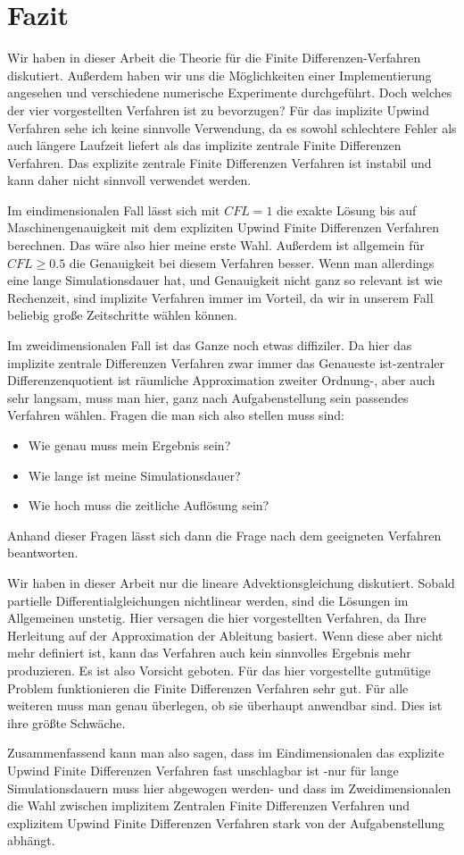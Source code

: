 \documentclass[12pt,a4paper]{scrartcl}
\numberwithin{equation}{section} %
\theoremstyle{definition}
\theoremstyle{plain}
\begin{document}
\section{Fazit}
Wir haben in dieser Arbeit die Theorie für die Finite Differenzen-Verfahren diskutiert. Außerdem haben wir uns die Möglichkeiten einer Implementierung angesehen und verschiedene numerische Experimente durchgeführt. Doch welches der vier vorgestellten Verfahren ist zu bevorzugen? Für das implizite Upwind Verfahren sehe ich keine sinnvolle Verwendung, da es sowohl schlechtere Fehler als auch längere Laufzeit liefert als das implizite zentrale Finite Differenzen Verfahren. Das explizite zentrale Finite Differenzen Verfahren ist instabil und kann daher nicht sinnvoll verwendet werden. 
\par Im eindimensionalen Fall lässt sich mit $CFL=1$ die exakte Lösung bis auf Maschinengenauigkeit mit dem expliziten Upwind Finite Differenzen Verfahren berechnen. Das wäre also hier meine erste Wahl. Außerdem ist allgemein für $CFL\ge 0.5$ die Genauigkeit bei diesem Verfahren besser. Wenn man allerdings eine lange Simulationsdauer hat, und Genauigkeit nicht ganz so relevant ist wie Rechenzeit, sind implizite Verfahren immer im Vorteil, da wir in unserem Fall beliebig große Zeitschritte wählen können.
\par Im zweidimensionalen Fall ist das Ganze noch etwas diffiziler. Da hier das implizite zentrale Differenzen Verfahren zwar immer das Genaueste ist-zentraler Differenzenquotient ist räumliche Approximation zweiter Ordnung-, aber auch sehr langsam, muss man hier, ganz nach Aufgabenstellung sein passendes Verfahren wählen. Fragen die man sich also stellen muss sind: 
\begin{itemize}
\item Wie genau muss mein Ergebnis sein?
\item Wie lange ist meine Simulationsdauer?
\item Wie hoch muss die zeitliche Auflösung sein?
\end{itemize}
Anhand dieser Fragen lässt sich dann die Frage nach dem geeigneten Verfahren beantworten. 
\par Wir haben in dieser Arbeit nur die lineare Advektionsgleichung diskutiert. Sobald partielle Differentialgleichungen nichtlinear werden, sind die Lösungen im Allgemeinen unstetig. Hier versagen die hier vorgestellten Verfahren, da Ihre Herleitung auf der Approximation der Ableitung basiert. Wenn diese aber nicht mehr definiert ist, kann das Verfahren auch kein sinnvolles Ergebnis mehr produzieren. Es ist also Vorsicht geboten. Für das hier vorgestellte gutmütige Problem funktionieren die Finite Differenzen Verfahren sehr gut. Für alle weiteren muss man genau überlegen, ob sie überhaupt anwendbar sind. Dies ist ihre größte Schwäche. 
\par 
Zusammenfassend kann man also sagen, dass im Eindimensionalen das explizite Upwind Finite Differenzen Verfahren fast unschlagbar ist -nur für lange Simulationsdauern muss hier abgewogen werden- und dass im Zweidimensionalen die Wahl zwischen implizitem Zentralen Finite Differenzen Verfahren und explizitem Upwind Finite Differenzen Verfahren stark von der Aufgabenstellung abhängt.
\appendix
\nocite{*}
\newpage
\end{document}
